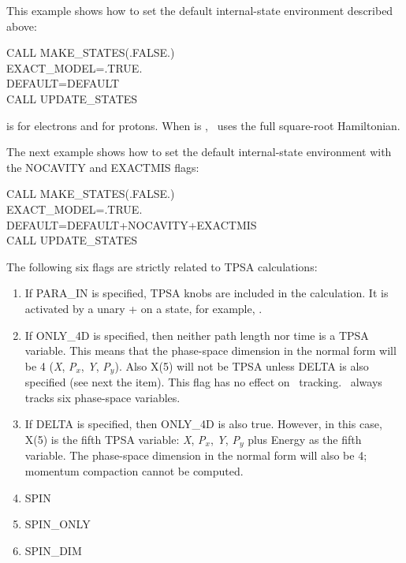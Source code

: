 This example shows how to set the default internal-state environment described
above:

\begin{ptccode}
CALL MAKE_STATES(.FALSE.)\\
EXACT_MODEL=.TRUE.\\
DEFAULT=DEFAULT\\
CALL UPDATE_STATES\\
\end{ptccode}

is for electrons and for protons.
When is  , \PTC\ uses the full square-root Hamiltonian.

The next example shows how to set the default internal-state environment with the
NOCAVITY and EXACTMIS flags:

\begin{ptccode}
CALL MAKE_STATES(.FALSE.)\\
EXACT_MODEL=.TRUE.\\
DEFAULT=DEFAULT+NOCAVITY+EXACTMIS\\
CALL UPDATE_STATES\\
\end{ptccode}

The following six flags are strictly related to TPSA calculations:

\begin{enumerate}
  \item If PARA_IN is specified, TPSA knobs are included in the calculation. It
is activated by a unary + on a state, for example, .
  \item If ONLY_4D is specified, then neither path length nor time is a TPSA variable.
This means that the phase-space dimension in the normal form will
be 4 (\emph{X}, \emph{P}$_{x}$, \emph{Y}, \emph{P}$_{y}$). Also X(5) will not be
TPSA unless DELTA is also specified (see next the item). This flag has no effect on
\PTC\ tracking. \PTC\ always tracks six phase-space variables.
  \item If DELTA is specified, then ONLY_4D is also true. However, in this case,
X(5) is the fifth TPSA variable:  \emph{X}, \emph{P}$_{x}$, \emph{Y}, \emph{P}$_{y}$ plus
Energy as the fifth variable. The phase-space dimension in the normal
form will also be 4; momentum compaction cannot be computed.
  \item SPIN
  \item SPIN_ONLY
  \item SPIN_DIM
\end{enumerate}

